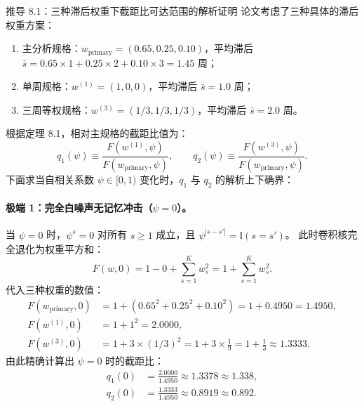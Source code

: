 \begin{derivationbox}{推导 8.1：三种滞后权重下截距比可达范围的解析证明}
论文考虑了三种具体的滞后权重方案：
\begin{enumerate}
  \item 主分析规格：$w_{\text{primary}} = (0.65, 0.25, 0.10)$，平均滞后 $\bar{s} = 0.65\times 1 + 0.25\times 2 + 0.10\times 3 = 1.45$ 周；
  \item 单周规格：$w^{(1)} = (1, 0, 0)$，平均滞后 $\bar{s} = 1.0$ 周；
  \item 三周等权规格：$w^{(3)} = (1/3, 1/3, 1/3)$，平均滞后 $\bar{s} = 2.0$ 周。
\end{enumerate}
根据定理 8.1，相对主规格的截距比值为：
\begin{equation}
  q_1(\psi) \equiv \frac{F(w^{(1)}, \psi)}{F(w_{\text{primary}}, \psi)}, \qquad q_2(\psi) \equiv \frac{F(w^{(3)}, \psi)}{F(w_{\text{primary}}, \psi)}.
\end{equation}
下面求当自相关系数 $\psi \in [0, 1)$ 变化时，$q_1$ 与 $q_2$ 的解析上下确界：

\paragraph{极端 1：完全白噪声无记忆冲击（$\psi = 0$）。}
当 $\psi = 0$ 时，$\psi^s = 0$ 对所有 $s \ge 1$ 成立，且 $\psi^{|s-s'|} = \mathbb{I}(s = s')$。
此时卷积核完全退化为权重平方和：
\begin{equation}
  F(w, 0) = 1 - 0 + \sum_{s=1}^K w_s^2 = 1 + \sum_{s=1}^K w_s^2.
\end{equation}
代入三种权重的数值：
\begin{align}
  F(w_{\text{primary}}, 0) &= 1 + (0.65^2 + 0.25^2 + 0.10^2) = 1 + 0.4950 = 1.4950, \\
  F(w^{(1)}, 0) &= 1 + 1^2 = 2.0000, \\
  F(w^{(3)}, 0) &= 1 + 3 \times (1/3)^2 = 1 + 3 \times \frac{1}{9} = 1 + \frac{1}{3} \approx 1.3333.
\end{align}
由此精确计算出 $\psi = 0$ 时的截距比：
\begin{align}
  q_1(0) &= \frac{2.0000}{1.4950} \approx 1.3378 \approx 1.338, \\
  q_2(0) &= \frac{1.3333}{1.4950} \approx 0.8919 \approx 0.892.
\end{align}


\end{derivationbox}
